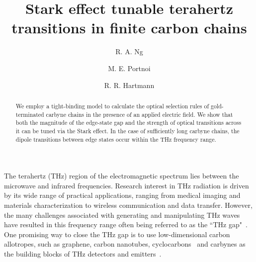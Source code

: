 \documentclass[
preprint,
 amsmath,amssymb,
 aps,
]{revtex4-2}
\begin{document}
\title{Stark effect tunable terahertz transitions in finite carbon chains}

\author{R. A. Ng}

\author{M. E. Portnoi}

\author{R. R. Hartmann}

\begin{abstract}
We employ a tight-binding model to calculate the optical selection rules of gold-terminated carbyne chains in the presence of an applied electric field. We show that both the magnitude of the edge-state gap and the strength of optical transitions across it can be tuned via the Stark effect. In the case of sufficiently long carbyne chains, the dipole transitions between edge states occur within the THz frequency range.
\end{abstract}

\maketitle

The terahertz (THz) region of the electromagnetic spectrum lies between the microwave and infrared frequencies. Research interest in THz radiation is driven by its wide range of practical applications, ranging from medical imaging and materials characterization to wireless communication and data transfer. However, the many challenges associated with generating and manipulating THz waves have resulted in this frequency range often being referred to as the ``THz gap"~\cite{dragoman2004terahertz, lee2007searching}. One promising way to close the THz gap is to use low-dimensional carbon allotropes, such as graphene, carbon nanotubes, cyclocarbons~\cite{ng2022tuning} and carbynes as the building blocks of THz detectors and emitters~\cite{hartmann2014terahertz,hartmann2021terahertz}.
\end{document}
